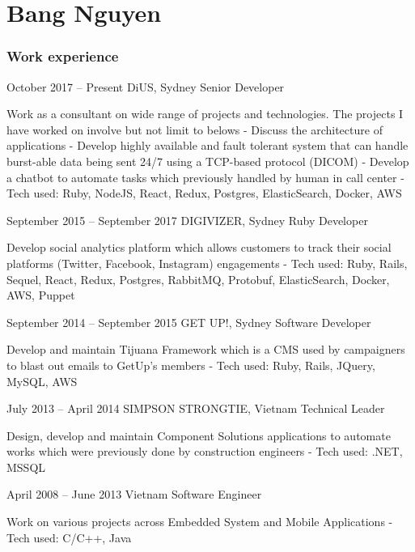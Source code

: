 \documentclass{tccv}
\begin{document}
\part{Bang Nguyen}

\section{Work experience}

\begin{eventlist}

\item{October 2017 -- Present}
    {DiUS, Sydney}
    {Senior Developer}

    Work as a consultant on wide range of projects and technologies. The projects
    I have worked on involve but not limit to belows
    \newline- Discuss the architecture of applications
    \newline- Develop highly available and fault tolerant system that can handle
    burst-able data being sent 24/7 using a TCP-based protocol (DICOM)
    \newline- Develop a chatbot to automate tasks which previously handled by
    human in call center
    \newline- Tech used: Ruby, NodeJS, React, Redux, Postgres, ElasticSearch,
    Docker, AWS

\item{September 2015 -- September 2017}
    {DIGIVIZER, Sydney}
    {Ruby Developer}

    Develop social analytics platform which allows customers to track their
    social platforms (Twitter, Facebook, Instagram) engagements
    \newline- Tech used: Ruby, Rails, Sequel, React, Redux, Postgres, RabbitMQ,
    Protobuf, ElasticSearch, Docker, AWS, Puppet

\item{September 2014 -- September 2015}
    {GET UP!, Sydney}
    {Software Developer}

    Develop and maintain Tijuana Framework which is a CMS
    used by campaigners to blast out emails to GetUp's members
    \newline- Tech used: Ruby, Rails, JQuery, MySQL, AWS

\item{July 2013 -- April 2014}
    {SIMPSON STRONGTIE, Vietnam}
    {Technical Leader}

    Design, develop and maintain Component Solutions applications to automate
    works which were previously done by construction engineers
    \newline- Tech used: .NET, MSSQL

\item{April 2008 -- June 2013}
    {Vietnam}
    {Software Engineer}

    Work on various projects across Embedded System and Mobile Applications
    \newline- Tech used: C/C++, Java

\end{eventlist}
\end{document}
